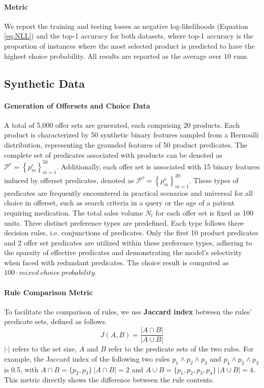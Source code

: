 \documentclass{article} %
\begin{document}
%
%
%
%


\paragraph{Metric} 
We report the training and testing losses as negative log-likelihoods (Equation \ref{eq:NLL}) and the top-1 accuracy for both datasets, where top-1 accuracy is the proportion of instances where the most selected product is predicted to have the highest choice probability. All results are reported as the average over 10 runs.

%
%


\subsection{Synthetic Data}
\paragraph{Generation of Offersets and Choice Data} 
%


A total of 5,000 offer sets are generated, each comprising 20 products. Each product is characterized by 50 synthetic binary features sampled from a Bernoulli distribution, representing the grounded features of 50 product predicates. The complete set of predicates associated with products can be denoted as \(\mathcal{P}^{c}=\left\{p_m^{c}\right\}_{m=1}^{50}\). Additionally, each offer set is associated with 15 binary features induced by offerset predicates, denoted as \(\mathcal{P}^{o}=\left\{p_m^{o}\right\}_{m=1}^{20}\). These types of predicates are frequently encountered in practical scenarios and universal for all choice in offerset, such as search criteria in a query or the age of a patient requiring medication. The total sales volume \(N_t\) for each offer set is fixed as 100 units. Three distinct preference types are predefined. Each type follows three decision rules, i.e. conjunctions of predicates. Only the first 10 product predicates and 2 offer set predicates are utilized within these preference types, adhering to the sparsity of effective predicates and demonstrating the model's selectivity when faced with redundant predicates. The choice result is computed as $100 \cdot mixed\ choice\ probability$.


%
%
%
%
%


\paragraph{Rule Comparison Metric} To facilitate the comparison of rules, we use \textbf{Jaccard index} between the rules' predicate sets, defined as follows.
\begin{equation}
    J(A, B) = \frac{|A \cap B|}{|A \cup B|}
\end{equation}
$|\cdot|$ refers to the set size, $A$ and $B$ refer to the predicate sets of the two rules. For example, the Jaccard index of the following two rules $p_1 \wedge p_2 \wedge p_3$ and $p_4 \wedge p_2 \wedge p_3$ is 0.5, with $A \cap B = \{p_2, p_3\}\ |A \cap B| = 2$ and $A \cup B = \{p_1, p_2, p_3, p_4\}\ |A \cup B| = 4$. This metric directly shows the difference between the rule contents.
\end{document}
